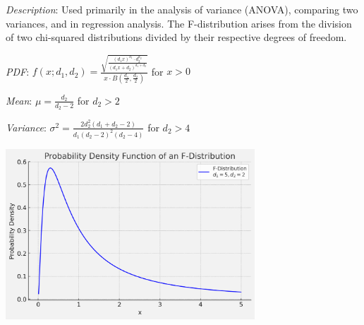 \documentclass{article}
\begin{document}
\begin{multicols}{2}
\begin{mdframed}
  \textit{Description}: Used primarily in the analysis of variance (ANOVA), comparing two variances, and in regression analysis. The F-distribution arises from the division of two chi-squared distributions divided by their respective degrees of freedom.
  
  \textit{PDF}: $f(x; d_1, d_2) = \frac{\sqrt{\frac{(d_1 x)^{d_1} \cdot d_2^{d_2}}{(d_1 x + d_2)^{d_1 + d_2}}}}{x \cdot B\left(\frac{d_1}{2}, \frac{d_2}{2}\right)}$ for $x > 0$
  
  \textit{Mean}: $\mu = \frac{d_2}{d_2 - 2}$ for $d_2 > 2$
  
  \textit{Variance}: $\sigma^2 = \frac{2d_2^2(d_1 + d_2 - 2)}{d_1(d_2 - 2)^2(d_2 - 4)}$ for $d_2 > 4$
  
  \begin{center}
    \includegraphics*[width=0.7\textwidth]{fdistribution.png}
  \end{center}
          
\end{mdframed}
              
\end{multicols}
\end{document}
